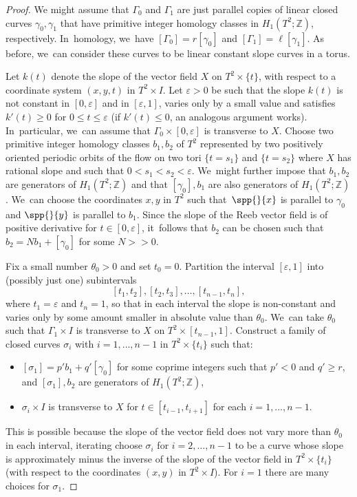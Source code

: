 \begin{proof}
We might assume that $\Gamma_0$ and $\Gamma_1$ are just parallel copies of linear closed curves $\gamma_0, \gamma_1$ that have primitive integer homology classes in $H_1(T^2;\mathbb{Z})$, respectively. In~homology, we~have $[\Gamma_0]=r[\gamma_0]$ and $[\Gamma_1]=\ell[\gamma_1]$. As before, we~can consider these curves to be linear constant slope curves in a torus.

Let $k(t)$ denote the slope of the vector field $X$ on $T^2\times \{t\}$, with respect to a coordinate system $(x,y,t)$ in $T^2\times I$. Let $\varepsilon>0$ be such that the slope $k(t)$ is not constant in $[0,\varepsilon]$ and in $[\varepsilon, 1]$, varies only by a small value and satisfies $k'(t)\geq 0$ for $0\leq t\leq \varepsilon$ (if $k'(t)\leq 0$, an analogous argument works). In~particular, we~can assume that $\Gamma_0\times [0, \varepsilon]$ is transverse to $X$. Choose two primitive integer homology classes $b_1, b_2$ of $T^2$ represented by two positively oriented periodic orbits of the flow on two tori $\{t=s_1\}$ and $\{t=s_2\}$ where $X$ has rational slope and such that $0<s_1<s_2<\varepsilon$. We~might further impose that $b_1,b_2$ are generators of $H_1(T^2;\mathbb{Z})$ and that $[\gamma_0],b_1$ are also generators of $H_1(T^2;\mathbb{Z})$. We~can choose the coordinates $x,y$ in $T^2$ such that~$\spp{}{x}$ is parallel to $\gamma_0$ and $\spp{}{y}$ is parallel to $b_1$. Since the slope of the Reeb vector field is of positive derivative for $t\in [0,\varepsilon]$, it~follows that $b_2$ can be chosen such that $b_2=Nb_1+[\gamma_0]$ for some $N>>0$.

Fix a small number $\theta_0>0$ and set $t_0=0$. Partition the interval $[\varepsilon,1]$ into (possibly just one) subintervals
\[
[t_1,t_2], [t_2,t_3],\dots, [t_{n-1},t_n],
\]
where $t_1=\varepsilon$ and $t_n=1$, so that in each interval the slope is non-constant and varies only by some amount smaller in absolute value than $\theta_0$. We~can take $\theta_0$ such that $\Gamma_1\times I$ is transverse to $X$ on $T^2\times [t_{n-1},1]$. Construct a family of closed curves $\sigma_i$ with $i=1,\dots,n-1$ in $T^2\times \{t_i\}$ such that:
\begin{itemize}
\item
$[\sigma_1]=p'b_1+q'[\gamma_0]$ for some coprime integers such that $p'<0$ and $q'\geq r$, and $[\sigma_1],b_2$ are generators of $H_1(T^2;\mathbb{Z})$,
\item
$\sigma_i\times I$ is transverse to $X$ for $t\in[t_{i-1},t_{i+1}]$ for each $i=1,\dots,n-1$.
\end{itemize}
This is possible because the slope of the vector field does not vary more than $\theta_0$ in each interval, iterating choose $\sigma_i$ for $i=2,\dots,n-1$ to be a curve whose slope is approximately minus the inverse of the slope of the vector field in $T^2\times \{t_i\}$ (with respect to the coordinates $(x,y)$ in $T^2 \times I$). For $i=1$ there are many choices for $\sigma_1$.


\end{proof}
